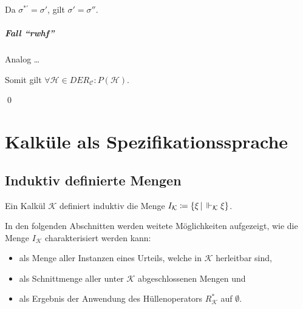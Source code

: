 																	Da $ \sigma ^ {*'} = \sigma' $, gilt $ \sigma' = \sigma'' $.

																\subparagraph{Fall \enquote{rwhf}}
																	Analog \dots

																Somit gilt $ \forall \mathcal{H} \in \textit{DER} _ \mathcal{C} : P(\mathcal{H}) $.

																\qed

													\section{Kalküle als Spezifikationssprache}
														\subsection{Induktiv definierte Mengen}
															Ein Kalkül $ \mathcal{K} $ definiert induktiv die Menge $ I _ \mathcal{K} \coloneqq \{ \xi \,\vert\, \Vdash _ \mathcal{K} \xi \} $.

															In den folgenden Abschnitten werden weitete Möglichkeiten aufgezeigt, wie die Menge $ I _ \mathcal{K} $ charakterisiert werden kann:
															\begin{itemize}
																\item als Menge aller Instanzen eines Urteils, welche in $ \mathcal{K} $ herleitbar sind,
																\item als Schnittmenge aller unter $ \mathcal{K} $ abgeschlossenen Mengen und
																\item als Ergebnis der Anwendung des Hüllenoperators $ R _ \mathcal{K} ^ * $ auf $ \emptyset $.
															\end{itemize}

